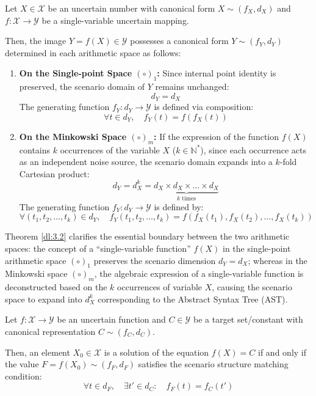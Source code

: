 \begin{theorem}
	\label{dl:3.2}
	Let $X \in \mathcal{X}$ be an uncertain number with canonical form $X \sim (f_X, d_X)$ and $f: \mathcal{X} \rightarrow \mathcal{Y}$ be a single-variable uncertain mapping. 
	
	Then, the image $Y = f(X) \in \mathcal{Y}$ possesses a canonical form $Y \sim (f_Y, d_Y)$ determined in each arithmetic space as follows:
	
	\begin{enumerate}
		\item \textbf{On the Single-point Space $(\circ)_1$:} 
		Since internal point identity is preserved, the scenario domain of $Y$ remains unchanged:
		\[
		d_Y = d_X
		\]
		The generating function $f_Y: d_Y \rightarrow \mathcal{Y}$ is defined via composition:
		\[
		\forall t \in d_Y, \quad f_Y(t) = f(f_X(t))
		\]
		
		\item \textbf{On the Minkowski Space $(\circ)_m$:} 
		If the expression of the function $f(X)$ contains $k$ occurrences of the variable $X$ ($k \in \mathbb{N}^*$), since each occurrence acts as an independent noise source, the scenario domain expands into a $k$-fold Cartesian product:
		\[
		d_Y = d_X^k = \underbrace{d_X \times d_X \times \dots \times d_X}_{k \text{ times}}
		\]
		The generating function $f_Y: d_Y \rightarrow \mathcal{Y}$ is defined by:
		\[
		\forall (t_1, t_2, \dots, t_k) \in d_Y, \quad f_Y(t_1, t_2, \dots, t_k) = f\left(f_X(t_1), f_X(t_2), \dots, f_X(t_k)\right)
		\]
	\end{enumerate}
\end{theorem}

\begin{remark}
	Theorem \ref{dl:3.2} clarifies the essential boundary between the two arithmetic spaces: the concept of a ``single-variable function'' $f(X)$ in the single-point arithmetic space $(\circ)_1$ preserves the scenario dimension $d_Y = d_X$; whereas in the Minkowski space $(\circ)_m$, the algebraic expression of a single-variable function is deconstructed based on the $k$ occurrences of variable $X$, causing the scenario space to expand into $d_X^k$ corresponding to the Abstract Syntax Tree (AST).
\end{remark}
\begin{theorem}
	Let $f : \mathcal{X} \to \mathcal{Y}$ be an uncertain function and $C \in \mathcal{Y}$ be a target set/constant with canonical representation $C \sim (f_C, d_C)$.
	
	Then, an element $X_0 \in \mathcal{X}$ is a solution of the equation $f(X) = C$ if and only if the value $F = f(X_0) \sim (f_F, d_F)$ satisfies the scenario structure matching condition:
	\[
	\forall t \in d_F, \quad \exists t' \in d_C : \quad f_F(t) = f_C(t')
	\]
\end{theorem}